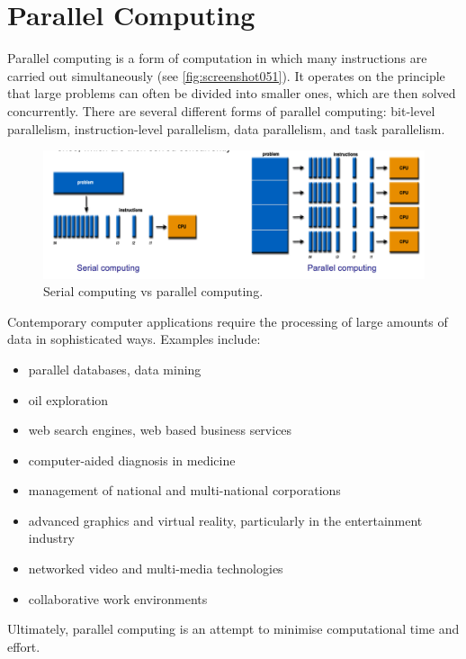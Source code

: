 \chapter{Parallel Computing}
Parallel computing is a form of computation in which many instructions are carried out simultaneously (see \autoref{fig:screenshot051}). It operates on the principle that large problems can often be divided into smaller ones, which are then solved concurrently. There are several different forms of parallel computing: bit-level parallelism, instruction-level parallelism, data parallelism, and task parallelism. 
\begin{figure}
\centering
\includegraphics[width=0.7\linewidth]{figures/screenshot051}
\caption{Serial computing vs parallel computing.}
\label{fig:screenshot051}
\end{figure}

Contemporary computer applications require the processing of large amounts of data in sophisticated ways. Examples include:  \begin{itemize}
\item parallel databases, data mining  
\item oil exploration  
\item web search engines, web based business services  
\item computer-aided diagnosis in medicine  
\item management of national and multi-national corporations  
\item advanced graphics and virtual reality, particularly in the entertainment industry  
\item networked video and multi-media technologies  
\item collaborative work environments  
\end{itemize}
Ultimately, parallel computing is an attempt to minimise computational time and effort. 

